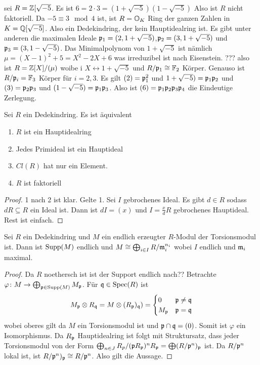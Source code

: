 \begin{Bsp} sei \(R=\mathbb{Z}[\sqrt{-5}\). Es ist \(6=2\cdot 3=(1+\sqrt{-5})(1-\sqrt{-5})\)
	Also ist  \(R\) nicht faktoriell. Da \(-5\equiv 3 \mod 4\) ist, ist \(R=\mathbb{O}_K\) Ring der ganzen Zahlen in 
	\(K=\mathbb{Q}[\sqrt{-5}]\). Also ein Dedekindring, der kein Hauptidealring ist.
	Es gibt unter anderen die maximalen Ideale 
	\(\mathfrak{p}_1=(2,1+\sqrt{-5})\),\(\mathfrak{p}_2=(3,1+\sqrt{-5})\) und \(\mathfrak{p}_3=(3,1-\sqrt{-5})\).
	Das Minimalpolynom von \(1+\sqrt{-5}\) ist nämlich \(\mu=(X-1)^2+5=X^2-2X+6\) was irreduzibel ist nach Eisenstein. ???
	also ist \(R=\mathbb{Z}[X]/(\mu)\) woibe i \(X\leftrightarrow 1+\sqrt{-5}\) und \(R/\mathfrak{p}_1\cong \mathbb{F}_2\) Körper.
	Genauso ist \(R/\mathfrak{p}_i=\mathbb{F}_3\) Körper für \(i=2,3\).
	Es gilt \((2)=\mathfrak{p}_1^2\) und \(1+\sqrt{-5})=\mathfrak{p}_1\mathfrak{p}_2\) und \((3)=\mathfrak{p}_2\mathfrak{p}_3\) und 
	\((1-\sqrt{-5})=\mathfrak{p}_1\mathfrak{p}_3\). Also ist \((6)=\mathfrak{p}_1\mathfrak{p}_2\mathfrak{p}_3\mathfrak{p}_4\) die Eindeutige Zerlegung.
	
\end{Bsp}

\begin{Lemma}
	Sei \(R\) ein Dedekindring. Es ist äquivalent
	\begin{enumerate}
		\item \(R\) ist ein Hauptidealring
		\item Jedes Primideal ist ein Hauptideal 
		\item \(Cl(R)\) hat nur ein Element.
		\item \(R\) ist faktoriell
	\end{enumerate}
\end{Lemma}
\begin{proof}
	1 nach 2 ist klar. Gelte 1. Sei \(I\) gebrochenes Ideal. Es gibt \(d\in R\) sodass \(dR\subseteq R\) ein Ideal ist.
	Dann ist \(dI=(x)\) und \(I=\frac x d R\) gebrochenes Hauptideal. Rest ist einfach.
\end{proof}
\begin{Satz} Sei \(R\) ein Dedekindring und \(M\) ein endlich erzeugter \(R\)-Modul der Torsionsmodul ist.
	Dann ist \(\operatorname{Supp}(M)\) endlich und \(M\cong \bigoplus_{i\in I}R/\mathfrak{m}_i^{n_i}\) wobei \(I\) endlich und \(\mathfrak{m}_i\) maximal.
	
\end{Satz}
\begin{proof}
	Da \(R\) noethersch ist ist der Support endlich nach??
	Betrachte \(\varphi\colon M\to \bigoplus_{\mathfrak{p}\in\operatorname{Supp}(M)}M_{\mathfrak{p}}\). 
	Für \(\mathfrak{q}\in\operatorname{Spec}(R)\) ist \[M_{\mathfrak{p}}\otimes R_{\mathfrak{q}}=M\otimes (R_{\mathfrak{p}})_{\mathfrak{q}})=
	\begin{cases} 0 & \mathfrak{p}\neq \mathfrak{q}\\ 
		M_{\mathfrak{p}} & \mathfrak{p}=\mathfrak{q}\\
	\end{cases}\]
	wobei oberes gilt da \(M\) ein Torsionsmodul ist und \(\mathfrak{p}\cap\mathfrak{q}=(0)\).
	Somit ist \(\varphi\) ein Isomorphismus.
	Da \(R_{\mathfrak{p}}\) Hauptidealring ist folgt mit Struktursatz, dass jeder Torsionsmodul von der Form
	\(\bigoplus_{n\in J}R_p/(\mathfrak{p} R_{\mathfrak{p}})^nR_{\mathfrak{p}}=\bigoplus (R/\mathfrak{p}^n)_{\mathfrak{p}}\) ist.
	Da \(R/\mathfrak{p}^n\) lokal ist, ist \(R/\mathfrak{p}^n)_{\mathfrak{p}}\cong R/\mathfrak{p}^n\). Also gilt die Aussage.
\end{proof}